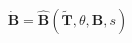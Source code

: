 \documentclass[preview]{standalone}
\begin{document}
\begin{align*}
\dot{\mathbf{B}} = \hat{\mathbf{B}}(\tilde{\mathbf{T}}, \theta, \mathbf{B}, s)
\end{align*}
\end{document}
